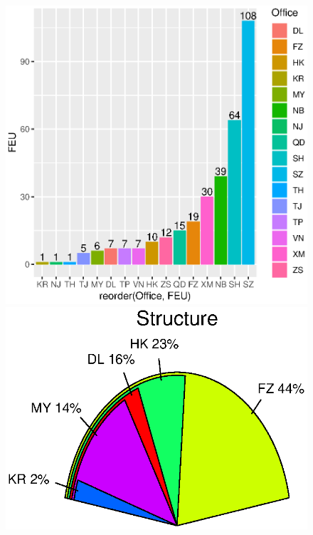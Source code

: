 \documentclass[a4paper]{article}
\begin{document}
		\begin{figure}
		\begin{center}
		\includegraphics{Rplot04}
		\includegraphics{Rplot09}
		\end{center}
		\end{figure}
\end{document}
